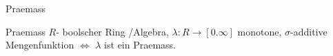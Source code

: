 \documentclass[class=article, crop=false]{standalone}
\begin{document}
\begin{zettel}{Praemass}
\begin{flashcard}{Praemass}
	$R$- boolscher Ring /Algebra, $\lambda : R \to  [0.\infty]$ monotone, $\sigma$-additive Mengenfunktion $\iff $ $\lambda$ ist ein Praemass.
\end{flashcard}
\end{zettel}
\end{document}
